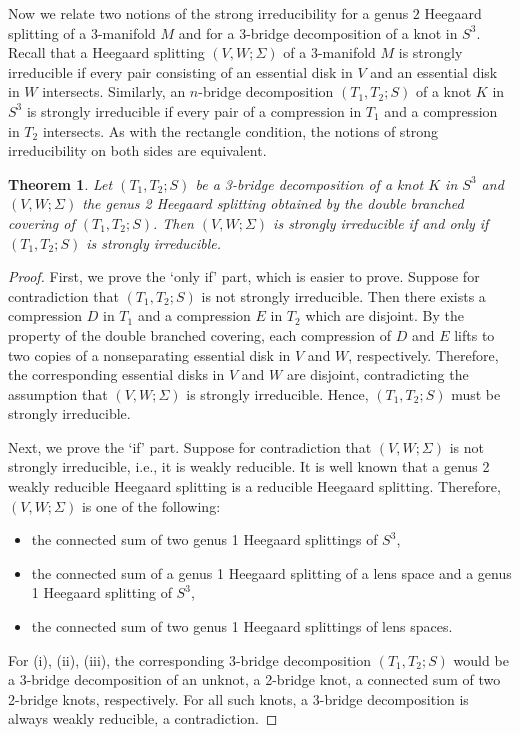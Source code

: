 \documentclass[12pt]{amsart}
\newtheorem{Thm}[theorem]{Theorem}
\begin{document}
Now we relate two notions of the strong irreducibility for a genus $2$ Heegaard splitting of a 3-manifold $M$ and for a 3-bridge decomposition of a knot in $S^3$.
Recall that a Heegaard splitting $(V, W; \Sigma)$ of a 3-manifold $M$ is strongly irreducible if every pair consisting of an essential disk in $V$ and an essential disk in $W$ intersects. Similarly, an $n$-bridge decomposition $(T_1, T_2;S)$ of a knot $K$ in $S^3$ is strongly irreducible if every pair of a compression in $T_1$ and a compression in $T_2$ intersects. As with the rectangle condition, the notions of strong irreducibility on both sides are equivalent.


\begin{Thm}\label{main result-intro-2}
Let $(T_1, T_2; S)$ be a 3-bridge decomposition of a knot $K$ in $S^3$ and
$(V, W;\Sigma)$ the genus 2 Heegaard splitting obtained by the double branched covering of
$(T_1, T_2; S)$. Then $(V, W;\Sigma)$ is strongly irreducible if and only if $(T_1, T_2; S)$
is strongly irreducible.
\end{Thm}


\begin{proof}
First, we prove the `only if' part, which is easier to prove. Suppose for contradiction that $(T_1, T_2; S)$
is not strongly irreducible. Then there exists a compression $D$ in $T_1$ and a compression $E$ in $T_2$ which
are disjoint. By the property of the double branched covering, each compression of $D$ and $E$ lifts to two copies of a nonseparating essential disk in $V$ and $W$, respectively.
Therefore, the corresponding essential disks in $V$ and $W$ are disjoint, contradicting the assumption that $(V, W; \Sigma)$ is strongly irreducible. Hence, $(T_1, T_2; S)$ must be strongly irreducible.

Next, we prove the `if' part. Suppose for contradiction that $(V, W;\Sigma)$ is not strongly irreducible, i.e.,
it is weakly reducible. It is well known that a genus 2 weakly
reducible Heegaard splitting is a reducible Heegaard splitting.
Therefore, $(V, W;\Sigma)$ is one of
the following:


\begin{itemize}
\item[(i)] the connected sum of two genus 1 Heegaard splittings of $S^3$,
\item[(ii)] the connected sum of a genus 1 Heegaard splitting of a lens space and a genus 1
Heegaard splitting of $S^3$,
\item[(iii)] the connected sum of two genus 1 Heegaard splittings of lens spaces.
\end{itemize}

For (i), (ii), (iii),  the corresponding $3$-bridge decomposition $(T_1, T_2; S)$ would be a $3$-bridge decomposition of an unknot, a 2-bridge
knot, a connected sum of two 2-bridge knots, respectively. For all such knots, a 3-bridge
decomposition is always weakly reducible, a contradiction.
\end{proof}
\end{document}
